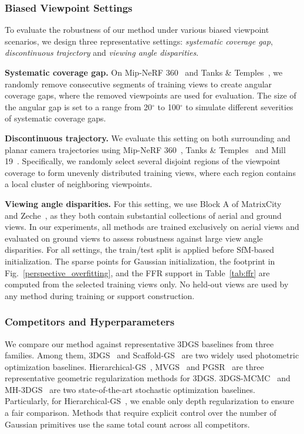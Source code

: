 \documentclass[lettersize,journal]{IEEEtran}
\begin{document}
\subsubsection{Biased Viewpoint Settings}

To evaluate the robustness of our method under various biased viewpoint scenarios, we design three representative settings: \emph{systematic coverage gap}, \emph{discontinuous trajectory} and \emph{viewing angle disparities}.

\textbf{Systematic coverage gap.}
On Mip-NeRF 360~\cite{mipnerf360} and Tanks \& Temples~\cite{tankstemples}, we randomly remove consecutive segments of training views to create angular coverage gaps, where the removed viewpoints are used for evaluation. 
The size of the angular gap is set to a range from 20$^\circ$ to 100$^\circ$ to simulate different severities of systematic coverage gaps.

\textbf{Discontinuous trajectory.}
We evaluate this setting on both surrounding and planar camera trajectories using Mip-NeRF 360~\cite{mipnerf360}, Tanks \& Temples~\cite{tankstemples} and Mill 19~\cite{meganerf}. Specifically, we randomly select several disjoint regions of the viewpoint coverage to form unevenly distributed training views, where each region contains a local cluster of neighboring viewpoints.

\textbf{Viewing angle disparities.}
For this setting, we use Block A of MatrixCity~\cite{matrixcity} and Zeche~\cite{isprs}, as they both contain substantial collections of aerial and ground views. In our experiments, all methods are trained exclusively on aerial views and evaluated on ground views to assess robustness against large view angle disparities.
For all settings, the train/test split is applied before SfM-based initialization. The sparse points for Gaussian initialization, the footprint in Fig.~\ref{perspective_overfitting}, and the FFR support in Table~\ref{tab:ffr} are computed from the selected training views only. No held-out views are used by any method during training or support construction.


\subsubsection{Competitors and Hyperparameters}

We compare our method against representative 3DGS baselines from three families. 
Among them, 3DGS~\cite{3dgs} and Scaffold-GS~\cite{scaffold} are two widely used photometric optimization baselines.
Hierarchical-GS~\cite{hierarchical}, MVGS~\cite{mvgs} and PGSR~\cite{pgsr} are three representative geometric regularization methods for 3DGS.
3DGS-MCMC~\cite{mcmc} and MH-3DGS~\cite{mh3dgs} are two state-of-the-art stochastic optimization baselines.
Particularly, for Hierarchical-GS~\cite{hierarchical}, we enable only depth regularization to ensure a fair comparison.
Methods that require explicit control over the number of Gaussian primitives use the same total count across all competitors. 
\end{document}
